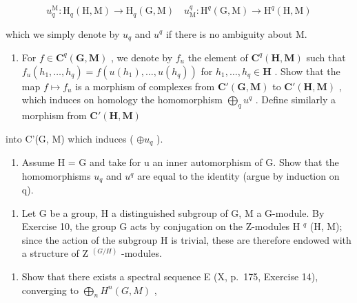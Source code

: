 \[
u _ {q} ^ {\mathrm{M}}: \mathrm{H} _ {q} (\mathrm{H}, \mathrm{M}) \rightarrow \mathrm{H} _ {q} (\mathrm{G}, \mathrm{M}) \quad u _ {\mathrm{M}} ^ {q}: \mathrm{H} ^ {q} (\mathrm{G}, \mathrm{M}) \rightarrow \mathrm{H} ^ {q} (\mathrm{H}, \mathrm{M})
\]

which we simply denote by \(u_q\) and \(u^q\) if there is no ambiguity about M.

\begin{enumerate}
\def\labelenumi{\alph{enumi})}
\tightlist
\item
  For \(f \in \mathbf{C}^q(\mathbf{G}, \mathbf{M})\) , we denote by \(f_u\) the element of \(\mathbf{C}^q(\mathbf{H}, \mathbf{M})\) such that \(f_u(h_1, \ldots, h_q) = f(u(h_1), \ldots, u(h_q))\) for \(h_1, \ldots, h_q \in \mathbf{H}\) . Show that the map \(f \mapsto f_u\) is a morphism of complexes from \(\mathbf{C}'(\mathbf{G}, \mathbf{M})\) to \(\mathbf{C}'(\mathbf{H}, \mathbf{M})\) , which induces on homology the homomorphism \(\bigoplus_{q} u^q\) . Define similarly a morphism from \(\mathbf{C}'(\mathbf{H}, \mathbf{M})\)
\end{enumerate}

into C'(G, M) which induces ( \(\oplus u_{q}\) ).

\begin{enumerate}
\def\labelenumi{\alph{enumi})}
\setcounter{enumi}{1}
\tightlist
\item
  Assume H = G and take for u an inner automorphism of G. Show that the homomorphisms \(u_{q}\) and \(u^{q}\) are equal to the identity (argue by induction on q).
\end{enumerate}

\begin{enumerate}
\def\labelenumi{\arabic{enumi})}
\setcounter{enumi}{10}
\tightlist
\item
  Let G be a group, H a distinguished subgroup of G, M a G-module. By Exercise 10, the group G acts by conjugation on the Z-modules H \(^{q}\) (H, M); since the action of the subgroup H is trivial, these are therefore endowed with a structure of Z \(^{(G/H)}\) -modules.
\end{enumerate}

\begin{enumerate}
\def\labelenumi{\alph{enumi})}
\tightlist
\item
  Show that there exists a spectral sequence E (X, p.~175, Exercise 14), converging to \(\bigoplus_{n} H^{n}(G, M)\) ,
\end{enumerate}

